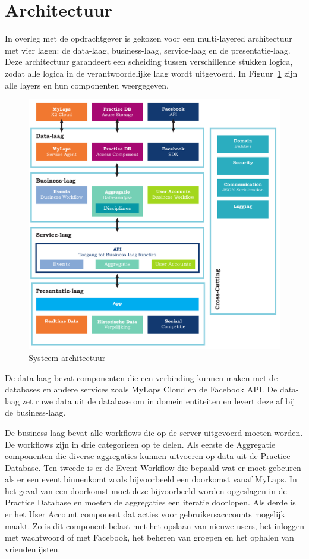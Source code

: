 \section{Architectuur}
In overleg met de opdrachtgever is gekozen voor een multi-layered architectuur met
vier lagen: de data-laag, business-laag, service-laag en de presentatie-laag. Deze 
architectuur garandeert een scheiding tussen verschillende stukken logica, zodat 
alle logica in de verantwoordelijke laag wordt uitgevoerd. In Figuur~\ref{fig:architecture} zijn alle layers en hun componenten weergegeven.

\begin{figure}
\centering
\includegraphics[width=\textwidth]{style/images/Architectuur}
\caption{Systeem architectuur}
\label{fig:architecture}
\end{figure}

De data-laag bevat componenten die een  verbinding kunnen maken met de databases en 
andere services zoals MyLaps Cloud en de Facebook API. De data-laag zet ruwe data 
uit de database om in domein entiteiten en levert deze af bij de business-laag.

De business-laag bevat alle workflows die op de server uitgevoerd moeten worden. 
De workflows zijn in drie categorieen op te delen. Als eerste de Aggregatie
componenten die diverse aggregaties kunnen uitvoeren op data uit de Practice
Database. Ten tweede is er de Event Workflow die bepaald wat er moet gebeuren als
er een event binnenkomt zoals bijvoorbeeld een doorkomst vanaf MyLaps. In het
geval van een doorkomst moet deze bijvoorbeeld worden opgeslagen in de Practice
Database en moeten de aggregaties een iteratie doorlopen. Als derde is er het User
Account component dat acties voor gebruikersacccounts mogelijk maakt. Zo is dit
component belast met het opslaan van nieuwe users, het inloggen met wachtwoord of
met Facebook, het beheren van groepen en het ophalen van vriendenlijsten.

